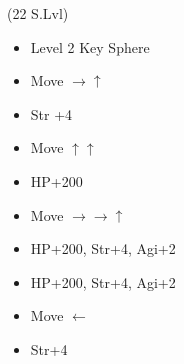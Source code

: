 \bothvfill
\winvfill
\lossvfill
\begin{spheregrid}
	\begin{itemize}
		\tidusf (22 S.Lvl)
		\begin{itemize}
			\item Level 2 Key Sphere
			\item Move $\rightarrow\uparrow$
			\item Str +4
			\item Move $\uparrow\uparrow$
			\item HP+200
			\item Move $\rightarrow\rightarrow\uparrow$
			\item HP+200, Str+4, Agi+2
			\item HP+200, Str+4, Agi+2
			\item Move $\leftarrow$
			\item Str+4
		\end{itemize}
	\end{itemize}
\end{spheregrid}
